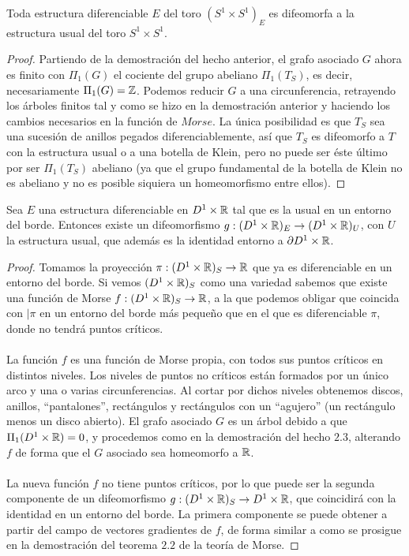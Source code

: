 \begin{hecho}
	Toda estructura diferenciable $E$ del toro $(S^1 \times S^1)_E$ es difeomorfa a la estructura usual del toro $S^1 \times S^1$.
\end{hecho}

\begin{proof}
	Partiendo de la demostración del hecho anterior, el grafo asociado $G$ ahora es finito con $\Pi_1(G)$ el cociente del grupo abeliano $\Pi_1(T_S)$, es decir, necesariamente $\Pi_1(G) = \mathbb{Z}$. Podemos reducir $G$ a una circunferencia, retrayendo los árboles finitos tal y como se hizo en la demostración anterior y haciendo los cambios necesarios en la función de $Morse$. La única posibilidad es que $T_S$ sea una sucesión de anillos pegados diferenciablemente, así que $T_S$ es difeomorfo a $T$ con la estructura usual o a una botella de Klein, pero no puede ser éste último por ser $\Pi_1(T_S)$ abeliano (ya que el grupo fundamental de la botella de Klein no es abeliano y no es posible siquiera un homeomorfismo entre ellos).
\end{proof}

\begin{hecho}
	Sea $E$ una estructura diferenciable en $D^1 \times \mathbb{R}$ tal que es la usual en un entorno del borde. Entonces existe un difeomorfismo $g:(D^1 \times \mathbb{R})_E \rightarrow (D^1 \times \mathbb{R})_U$, con $U$ la estructura usual, que además es la identidad entorno a $\partial D^1 \times \mathbb{R}$.
\end{hecho}

\begin{proof}
	Tomamos la proyección $\pi : (D^1 \times \mathbb{R})_S \rightarrow \mathbb{R}$ que ya es diferenciable en un entorno del borde. Si vemos $(D^1 \times \mathbb{R})_{S}$ como una variedad sabemos que existe una  función de Morse $f : (D^1 \times \mathbb{R})_S \rightarrow \mathbb{R}$, a la que podemos obligar que coincida con $|\pi$ en un entorno del borde más pequeño que en el que es diferenciable $\pi$, donde no tendrá puntos críticos. \\
	\\ La función $f$ es una función de Morse propia, con todos sus puntos críticos en distintos niveles. Los niveles de puntos no críticos están formados por un único arco y una o varias circunferencias. Al cortar por dichos niveles obtenemos discos, anillos, ``pantalones'', rectángulos y rectángulos con un ``agujero'' (un rectángulo menos un disco abierto). El grafo asociado $G$ es un árbol debido a que $\Pi_1(D^1 \times \mathbb{R}) = 0$, y procedemos como en la demostración del hecho $2.3$, alterando $f$ de forma que el $G$ asociado sea homeomorfo a $\mathbb{R}$. \\
	\\ La nueva función $f$ no tiene puntos críticos, por lo que puede ser la segunda componente de un difeomorfismo $g:(D^1 \times \mathbb{R})_S \rightarrow D^1 \times \mathbb{R}$, que coincidirá con la identidad en un entorno del borde. La primera componente se puede obtener a partir del campo de vectores gradientes de $f$, de forma similar a como se prosigue en la demostración del teorema $2.2$ de la teoría de Morse.
\end{proof}

